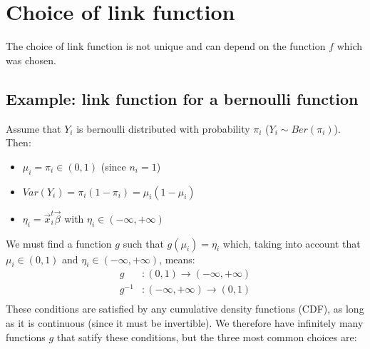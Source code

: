   \section{Choice of link function}
    The choice of link function is not unique and can depend on the function $f$ which was chosen.

    \subsection{Example: link function for a bernoulli function}
      Assume that $Y_i$ is bernoulli distributed with probability $\pi_i$ ($Y_i \sim Ber(\pi_i)$). Then:
      \begin{itemize}
        \item $\mu_i = \pi_i \in (0,1)$ (since $n_i = 1$)
        \item $Var(Y_i) = \pi_i(1-\pi_i) = \mu_i(1-\mu_i)$
        \item $\eta_i = \vec{x}_i^t\vec{\beta}$ with $\eta_i \in (-\infty, +\infty)$
      \end{itemize}
      We must find a function $g$ such that $g(\mu_i)=\eta_i$ which, taking into account that $\mu_i \in (0, 1)$ and $\eta_i \in (-\infty, +\infty)$, means:
      \begin{align*}
        g&: (0, 1) \to (-\infty, +\infty) \\
        g^{-1}&: (-\infty, +\infty) \to (0, 1)  \\
      \end{align*}
      These conditions are satisfied by any cumulative density functions (CDF), as long as it is continuous (since it must be invertible).
      We therefore have infinitely many functions $g$ that satify these conditions, but the three most common choices are:
